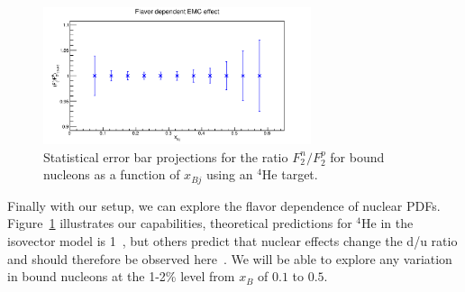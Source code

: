 \begin{figure}
  \begin{center}
    \includegraphics[angle=0, width=0.7\textwidth]{./fig-chap3/flavor}
    \caption{Statistical error bar projections for the ratio $F_2^n/F_2^p$ for bound nucleons as a function of $x_{Bj}$ using an $^4$He target.}
    \label{fig:flavor_proj}
  \end{center}
\end{figure}

Finally with our setup, we can explore the flavor dependence of nuclear PDFs. Figure~\ref{fig:flavor_proj} illustrates our capabilities, theoretical predictions for $^4$He in the isovector model is 1~\cite{Cloet2009}, but others predict that nuclear effects change the d/u ratio and should therefore be observed here~\cite{Brodsky:2004qa}. We will be able to explore any variation in bound nucleons at the 1-2\% level from $x_B$ of $0.1$ to $0.5$.


